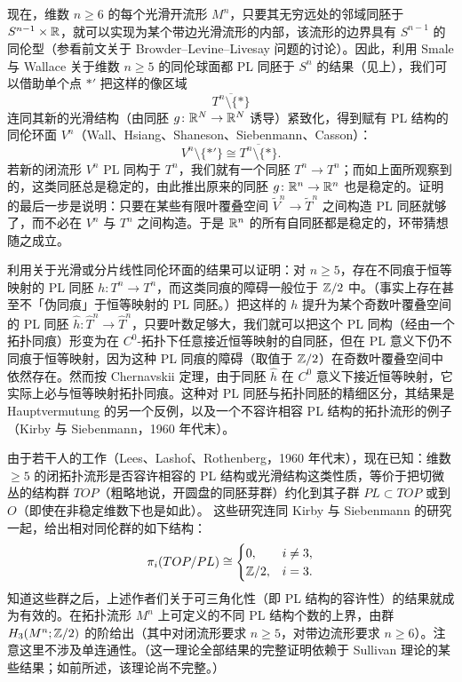 现在，维数 $n\ge 6$ 的每个光滑开流形 $M^{n}$，只要其无穷远处的邻域同胚于 $S^{n-1}\times\mathbb{R}$，就可以实现为某个带边光滑流形的内部，该流形的边界具有 $S^{n-1}$ 的同伦型（参看前文关于 Browder--Levine--Livesay 问题的讨论）。因此，利用 Smale 与 Wallace 关于维数 $n\ge 5$ 的同伦球面都 PL 同胚于 $S^{n}$ 的结果（见上），我们可以借助单个点 $*'$ 把这样的像区域
\[
\overline{T^{n}\setminus\{*\}}
\]
连同其新的光滑结构（由同胚 $g\colon\mathbb{R}^{N}\to\mathbb{R}^{N}$ 诱导）紧致化，得到赋有 PL 结构的同伦环面 $V^{n}$（Wall、Hsiang、Shaneson、Siebenmann、Casson）：
\[
V^{n}\setminus\{*'\}\cong\overline{T^{n}\setminus\{*\}}.
\]
若新的闭流形 $V^{n}$ PL 同构于 $T^{n}$，我们就有一个同胚 $T^{n}\to T^{n}$；而如上面所观察到的，这类同胚总是稳定的，由此推出原来的同胚 $g\colon\mathbb{R}^{n}\to\mathbb{R}^{n}$ 也是稳定的。证明的最后一步是说明：只要在某些有限叶覆叠空间 $\tilde V^{n}\to\tilde T^{n}$ 之间构造 PL 同胚就够了，而不必在 $V^{n}$ 与 $T^{n}$ 之间构造。于是 $\mathbb{R}^{n}$ 的所有自同胚都是稳定的，环带猜想随之成立。

利用关于光滑或分片线性同伦环面的结果可以证明：对 $n\ge 5$，存在不同痕于恒等映射的 PL 同胚 $h\colon T^{n}\to T^{n}$，而这类同痕的障碍一般位于 $\mathbb{Z}/2$ 中。（事实上存在甚至不「伪同痕」于恒等映射的 PL 同胚。）把这样的 $h$ 提升为某个奇数叶覆叠空间的 PL 同胚 $\hat h\colon\hat T^{n}\to\hat T^{n}$，只要叶数足够大，我们就可以把这个 PL 同构（经由一个拓扑同痕）形变为在 $C^{0}$-拓扑下任意接近恒等映射的自同胚，但在 PL 意义下仍不同痕于恒等映射，因为这种 PL 同痕的障碍（取值于 $\mathbb{Z}/2$）在奇数叶覆叠空间中依然存在。然而按 Chernavskii 定理，由于同胚 $\hat h$ 在 $C^{0}$ 意义下接近恒等映射，它实际上必与恒等映射拓扑同痕。这种对 PL 同胚与拓扑同胚的精细区分，其结果是 Hauptvermutung 的另一个反例，以及一个不容许相容 PL 结构的拓扑流形的例子（Kirby 与 Siebenmann，1960 年代末）。%

由于若干人的工作（Lees、Lashof、Rothenberg，1960 年代末），现在已知：维数 $\ge 5$ 的闭拓扑流形是否容许相容的 PL 结构或光滑结构这类性质，等价于把切微丛的结构群 $TOP$（粗略地说，开圆盘的同胚芽群）约化到其子群 $PL\subset TOP$ 或到 $O$（即使在非稳定维数下也是如此）。
这些研究连同 Kirby 与 Siebenmann 的研究一起，给出相对同伦群的如下结构：
\[
\pi_{i}(TOP/PL)\cong
\begin{cases}
0, & i\ne 3,\\
\mathbb{Z}/2, & i=3.
\end{cases}
\]
知道这些群之后，上述作者们关于可三角化性（即 PL 结构的容许性）的结果就成为有效的。在拓扑流形 $M^{n}$ 上可定义的不同 PL 结构个数的上界，由群 $H_{3}(M^{n};\mathbb{Z}/2)$ 的阶给出（其中对闭流形要求 $n\ge 5$，对带边流形要求 $n\ge 6$）。注意这里不涉及单连通性。（这一理论全部结果的完整证明依赖于 Sullivan 理论的某些结果；如前所述，该理论尚不完整。）

